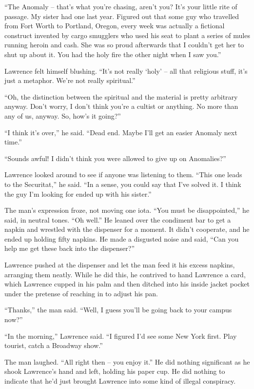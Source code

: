 “The Anomaly -- that's what you're chasing, aren't you? It's your 
little rite of passage. My sister had one last year. Figured out that 
some guy who travelled from Fort Worth to Portland, Oregon, every week 
was actually a fictional construct invented by cargo smugglers who used 
his seat to plant a series of mules running heroin and cash. She was so 
proud afterwards that I couldn't get her to shut up about it. You had 
the holy fire the other night when I saw you.”

Lawrence felt himself blushing. “It's not really `holy' -- all that 
religious stuff, it's just a metaphor. We're not really spiritual.”

“Oh, the distinction between the spiritual and the material is pretty 
arbitrary anyway. Don't worry, I don't think you're a cultist or 
anything. No more than any of us, anyway. So, how's it going?”

“I think it's over,” he said. “Dead end. Maybe I'll get an easier 
Anomaly next time.”

“Sounds awful! I didn't think you were allowed to give up on 
Anomalies?”

Lawrence looked around to see if anyone was listening to them. “This 
one leads to the Securitat,” he said. “In a sense, you could say 
that I've solved it. I think the guy I'm looking for ended up with his 
sister.”

The man's expression froze, not moving one iota. “You must be 
disappointed,” he said, in neutral tones. “Oh well.” He leaned 
over the condiment bar to get a napkin and wrestled with the dispenser 
for a moment. It didn't cooperate, and he ended up holding fifty 
napkins. He made a disgusted noise and said, “Can you help me get 
these back into the dispenser?”

Lawrence pushed at the dispenser and let the man feed it his excess 
napkins, arranging them neatly. While he did this, he contrived to hand 
Lawrence a card, which Lawrence cupped in his palm and then ditched 
into his inside jacket pocket under the pretense of reaching in to 
adjust his pan.

“Thanks,” the man said. “Well, I guess you'll be going back to 
your campus now?”

“In the morning,” Lawrence said. “I figured I'd see some New York 
first. Play tourist, catch a Broadway show.”

The man laughed. “All right then -- you enjoy it.” He did nothing 
significant as he shook Lawrence's hand and left, holding his paper 
cup. He did nothing to indicate that he'd just brought Lawrence into 
some kind of illegal conspiracy.

